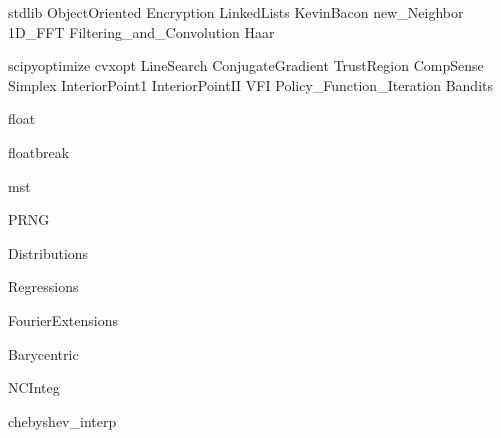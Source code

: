 \documentclass[nociteref]{SIAM-GH-book}
\begin{document}
{stdlib}
{ObjectOriented}
{Encryption}
{LinkedLists}
{KevinBacon}
{new_Neighbor}
{1D_FFT}
{Filtering_and_Convolution}
{Haar}


{scipyoptimize}
{cvxopt}
{LineSearch}
{ConjugateGradient}
{TrustRegion}
{CompSense}
{Simplex}
{InteriorPoint1}
{InteriorPointII}
{VFI}
{Policy_Function_Iteration}
{Bandits}



{float}

{floatbreak}

{mst}

{PRNG}

{Distributions}

{Regressions}

{FourierExtensions}

{Barycentric}

{NCInteg}

{chebyshev_interp}
\end{document}
